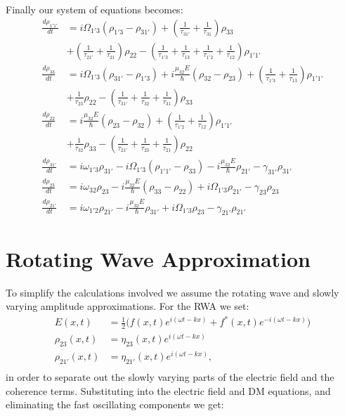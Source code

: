 \documentclass[10pt,english,fleqn]{article}%
\begin{document}
Finally our system of equations becomes:  
\begin{align}
\label{eq:mblochbase-start}
\frac{d \rho_{1'1'}}{d t} &= i\Omega_{1'3} (\rho_{1'3} - \rho_{31'}) + (\frac{1}{\tau_{31'}} + \frac{1}{\tau_{31}})\rho_{33}  \\ 
& + (\frac{1}{\tau_{21'}} + \frac{1}{\tau_{21}})\rho_{22} - (\frac{1}{\tau_{1'3}} + \frac{1}{\tau_{13}} + \frac{1}{\tau_{1'2}} + \frac{1}{\tau_{12}})\rho_{1'1'} \\
\frac{d \rho_{33}}{d t}   &= i\Omega_{1'3} (\rho_{31'} - \rho_{1'3}) + i\frac{\mu_32 E}{\hbar} (\rho_{32}-\rho_{23})+ (\frac{1}{\tau_{1'3}} + \frac{1}{\tau_{13}})\rho_{1'1'} \nonumber \\ 
& +  \frac{1}{\tau_{23}}\rho_{22} - (\frac{1}{\tau_{31'}} + \frac{1}{\tau_{32}} + \frac{1}{\tau_{31}}) \rho_{33} \\
\frac{d \rho_{22}}{d t}   &= i\frac{\mu_32 E}{\hbar} (\rho_{23}-\rho_{32}) + (\frac{1}{\tau_{1'2}} + \frac{1}{\tau_{12}})\rho_{1'1'} \\ 
& +  \frac{1}{\tau_{32}}\rho_{33} - (\frac{1}{\tau_{21'}} + \frac{1}{\tau_{23}} + \frac{1}{\tau_{21}}) \rho_{22} \\
\frac{d \rho_{31'}}{d t}  &= i\omega_{1'3}\rho_{31'} -i \Omega_{1'3}(\rho_{1'1'} - \rho_{33}) -i\frac{\mu_{32}E}{\hbar}\rho_{21'} -\gamma_{31'}\rho_{31'} \\
\frac{d \rho_{23}}{d t}   &= i\omega_{32}\rho_{23} -i \frac{\mu_{32}E}{\hbar}(\rho_{33}-\rho_{22}) +i\Omega_{1'3}\rho_{21'} - \gamma_{23}\rho_{23} \\
\frac{d \rho_{21'}}{d t}  &= i\omega_{1'2}\rho_{21'} -i\frac{\mu_{32}E}{\hbar}\rho_{31'} +i\Omega_{1'3}\rho_{23} -\gamma_{21'}\rho_{21'} 
\label{eq:mblochbase-end}
\end{align}

\section{Rotating Wave Approximation}

To simplify the calculations involved we assume the rotating wave and slowly varying amplitude approximations. For the RWA we set: 
\begin{align}
  E(x,t) &= \frac{1}{2} \big ( f(x,t) e^{i(\omega t - kx)} + f^*(x,t)   e^{-i(\omega t - kx)} \big ) \nonumber \\ 
  \rho_{23}(x,t)  &= \eta_{23}(x,t) e^{i(\omega t - kx) } \nonumber \\
  \rho_{21'}(x,t) &= \eta_{21'}(x,t) e^{i(\omega t - kx) }, \\
\end{align}
in order to separate out the slowly varying parts of the electric field and the coherence terms. Substituting into the electric field and DM equations, and 
eliminating the fast oscillating components we get: 
\end{document}

